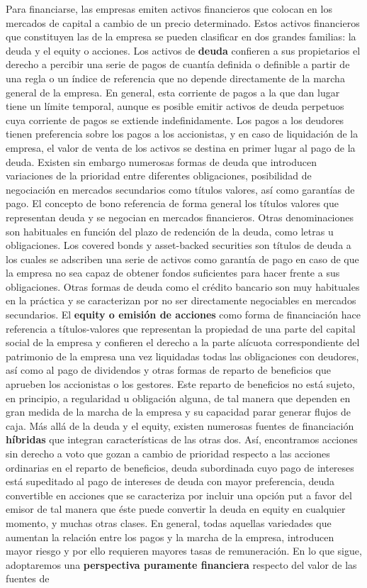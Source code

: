 \documentclass{nuevotema}
\begin{document}
Para financiarse, las empresas emiten activos financieros que colocan en los mercados de capital a cambio de un precio determinado. Estos activos financieros que constituyen las  de la empresa se pueden clasificar en dos grandes familias: la deuda y el equity o acciones. Los activos de \textbf{deuda} confieren a sus propietarios el derecho a percibir una serie de pagos de cuantía definida o definible a partir de una regla o un índice de referencia que no depende directamente de la marcha general de la empresa. En general, esta corriente de pagos a la que dan lugar tiene un límite temporal, aunque es posible emitir activos de deuda perpetuos cuya corriente de pagos se extiende indefinidamente. Los pagos a los deudores tienen preferencia sobre los pagos a los accionistas, y en caso de liquidación de la empresa, el valor de venta de los activos se destina en primer lugar al pago de la deuda. Existen sin embargo numerosas formas de deuda que introducen variaciones de la prioridad entre diferentes obligaciones, posibilidad de negociación en mercados secundarios como títulos valores, así como garantías de pago. El concepto de bono referencia de forma general los títulos valores que representan deuda y se negocian en mercados financieros. Otras denominaciones son habituales en función del plazo de redención de la deuda, como letras u obligaciones. Los covered bonds y asset-backed securities son títulos de deuda a los cuales se adscriben una serie de activos como garantía de pago en caso de que la empresa no sea capaz de obtener fondos suficientes para hacer frente a sus obligaciones. Otras formas de deuda como el crédito bancario son muy habituales en la práctica y se caracterizan por no ser directamente negociables en mercados secundarios. El \textbf{equity o emisión de acciones} como forma de financiación hace referencia a títulos-valores que representan la propiedad de una parte del capital social de la empresa y confieren el derecho a la parte alícuota correspondiente del patrimonio de la empresa una vez liquidadas todas las obligaciones con deudores, así como al pago de dividendos y otras formas de reparto de beneficios que aprueben los accionistas o los gestores. Este reparto de beneficios no está sujeto, en principio, a regularidad u obligación alguna, de tal manera que dependen en gran medida de la marcha de la empresa y su capacidad parar generar flujos de caja. Más allá de la deuda y el equity, existen numerosas fuentes de financiación \textbf{híbridas} que integran características de las otras dos. Así, encontramos acciones sin derecho a voto que gozan a cambio de prioridad respecto a las acciones ordinarias en el reparto de beneficios, deuda subordinada cuyo pago de intereses está supeditado al pago de intereses de deuda con mayor preferencia, deuda convertible en acciones que se caracteriza por incluir una opción put a favor del emisor de tal manera que éste puede convertir la deuda en equity en cualquier momento, y muchas otras clases. En general, todas aquellas variedades que aumentan la relación entre los pagos y la marcha de la empresa, introducen mayor riesgo y por ello requieren mayores tasas de remuneración. En lo que sigue, adoptaremos una \textbf{perspectiva puramente financiera} respecto del valor de las fuentes de 
\end{document}
